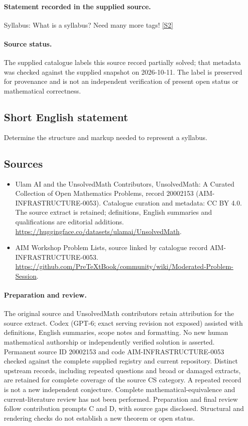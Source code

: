 \documentclass[11pt]{article}
\begin{document}
\paragraph{Statement recorded in the supplied source.}
Syllabus: What is a syllabus? Need many more tags! \href{https://github.com/PreTeXtBook/community/wiki/Moderated-Problem-Session}{[S2]}
\paragraph{Source status.}
The supplied catalogue labels this source record partially solved; that metadata was checked against the supplied snapshot on 2026-10-11. The label is preserved for provenance and is not an independent verification of present open status or mathematical correctness.
\subsection{Short English statement}
Determine the structure and markup needed to represent a syllabus.
\subsection{Sources}
\begin{itemize}
\item[S1] Ulam AI and the UnsolvedMath Contributors, UnsolvedMath: A Curated Collection of Open Mathematics Problems, record 20002153 (AIM-INFRASTRUCTURE-0053). Catalogue curation and metadata: CC BY 4.0. The source extract is retained; definitions, English summaries and qualifications are editorial additions.
\url{https://huggingface.co/datasets/ulamai/UnsolvedMath}.
\item[S2] AIM Workshop Problem Lists, source linked by catalogue record AIM-INFRASTRUCTURE-0053.
\url{https://github.com/PreTeXtBook/community/wiki/Moderated-Problem-Session}.
\end{itemize}
\paragraph{Preparation and review.}
The original source and UnsolvedMath contributors retain attribution for the source extract. Codex (GPT-6; exact serving revision not exposed) assisted with definitions, English summaries, scope notes and formatting. No new human mathematical authorship or independently verified solution is asserted. Permanent source ID 20002153 and code AIM-INFRASTRUCTURE-0053 checked against the complete supplied registry and current repository. Distinct upstream records, including repeated questions and broad or damaged extracts, are retained for complete coverage of the source CS category. A repeated record is not a new independent conjecture. Complete mathematical-equivalence and current-literature review has not been performed. Preparation and final review follow contribution prompts C and D, with source gaps disclosed. Structural and rendering checks do not establish a new theorem or open status.
\label{end:20002153}
\end{document}
